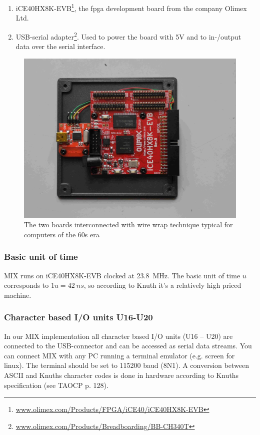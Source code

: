 \documentclass[a4paper,ngerman]{scrartcl}
\begin{document}
\begin{enumerate}
	\item iCE40HX8K-EVB\footnote{\href{www.olimex.com/Products/FPGA/iCE40/iCE40HX8K-EVB}{www.olimex.com/Products/FPGA/iCE40/iCE40HX8K-EVB}}, the fpga development board from the company Olimex Ltd.	
	\item  USB-serial adapter\footnote{\href{www.olimex.com/Products/Breadboarding/BB-CH340T}{www.olimex.com/Products/Breadboarding/BB-CH340T}}. Used to power the board with 5V and to in-/output data over the serial interface.
\end{enumerate}

\begin{figure}
	\centering
	\includegraphics[width=0.7\linewidth]{MIX_inside.jpg}
	\caption{The two boards interconnected with wire wrap technique typical for computers of the 60s era}
	\label{fig:mixinside}
\end{figure}




\subsubsection{Basic unit of time}
MIX runs on iCE40HX8K-EVB clocked at \SI{23.8}{MHz}. The basic unit of time $u$ corresponds to $1u=\SI{42}{ns}$, so according to Knuth it's a relatively high priced machine.

\subsubsection{Character based I/O units U16-U20}
In our MIX implementation all character based I/O units (U16 -- U20) are connected to the USB-connector and can be accessed as serial data streams. You can connect MIX with any PC running a terminal emulator (e.g. screen for linux). The terminal should be set to 115200 baud (8N1). A conversion between ASCII and Knuths character codes is done in hardware according to Knuths specification (see TAOCP p. 128).
\end{document}
